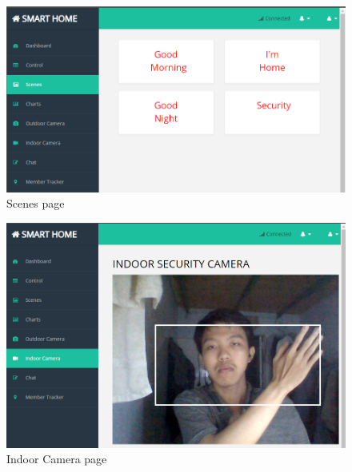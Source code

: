 \begin{figure}[!ht]
    \begin{center}
    \includegraphics[scale=0.65]{images/scenario.png}
    \caption{Scenes page}
    \label{fig:scenario}
    \end{center}
\end{figure}
\begin{figure}[!ht]
    \begin{center}
    \includegraphics[scale=0.65]{images/indoor.png}
    \caption{Indoor Camera page}
    \label{fig:indoor}
    \end{center}
\end{figure}
